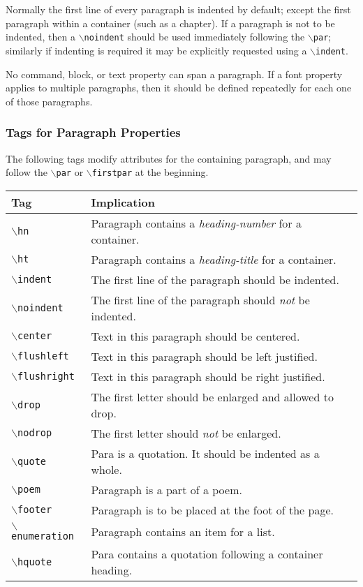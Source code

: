 \documentclass[11pt]{article}
\newcommand{\cmd}[1]{{\tt $\backslash$#1}}
\begin{document}
Normally the first line of every paragraph is indented by default;
except the first paragraph within a container (such as a chapter). If
a paragraph is not to be indented, then a \cmd{noindent} should be
used immediately following the \cmd{par}; similarly if indenting is
required it may be explicitly requested using a \cmd{indent}.

No command, block, or text property can span a paragraph. If a font
property applies to multiple paragraphs, then it should be defined
repeatedly for each one of those paragraphs.

\subsubsection{Tags for Paragraph Properties}

The following tags modify attributes for the containing paragraph, and
may follow the \cmd{par} or \cmd{firstpar} at the beginning.

\begin{tabular}{l|l}
  Tag & Implication\\
\hline
  \cmd{hn} &  Paragraph contains a \emph{heading-number} for a container. \\
  \cmd{ht} &  Paragraph contains a \emph{heading-title} for a container. \\
  \cmd{indent} & The first line of the paragraph should be indented.\\
  \cmd{noindent} & The first line of the paragraph should \emph{not}
  be indented.\\

  \cmd{center} & Text in this paragraph should be centered.\\
  \cmd{flushleft} & Text in this paragraph should be left justified.\\
  \cmd{flushright} & Text in this paragraph should be right justified.\\
  \cmd{drop} & The first letter should be enlarged and allowed to drop.\\
  \cmd{nodrop} & The first letter should \emph{not} be enlarged.\\
  \cmd{quote} & Para is a quotation. It should be indented as a whole.\\
  \cmd{poem} & Paragraph is a part of a poem.\\
  \cmd{footer} & Paragraph is to be placed at the foot of the page.\\
  \cmd{enumeration} & Paragraph contains an item for a list.\\
  \cmd{hquote} & Para contains a quotation following a container heading.
\end{tabular}
\vspace{0.25cm}
\end{document}
